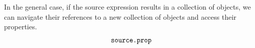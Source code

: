 In the general case, if the source expression results in a collection of objects, we can navigate their references to a new collection of objects and access their properties.
$$\texttt{source.prop}$$








